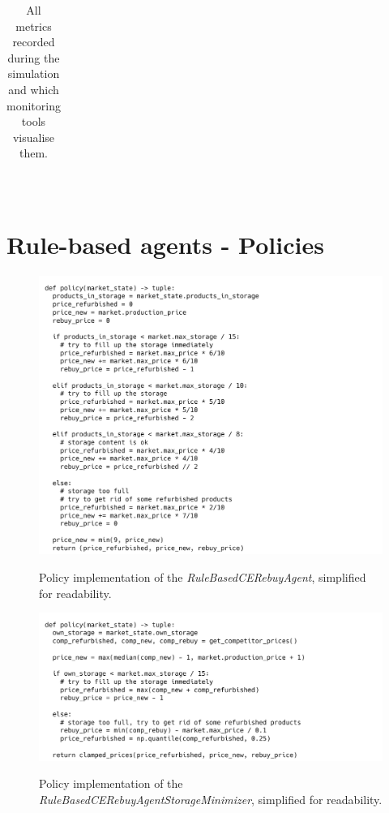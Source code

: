 \begin{table}[!]
\begin{tabular}{|cr|p{2.2mm}|p{2.2mm}|p{2.2mm}|p{2.2mm}|p{2.2mm}|p{2.2mm}|p{2.2mm}|p{2.2mm}|p{2.2mm}|p{2.2mm}|p{2.2mm}|p{2.2mm}|p{2.2mm}|p{2.2mm}|p{2.2mm}|p{2.2mm}|}
	\end{tabular}\\
	\caption{All metrics recorded during the simulation and which monitoring tools visualise them.}\label{tab:AllMetrics}
\end{table}

\newpage
\section{Rule-based agents - Policies}\label{sec:AppendixPolicies}

\begin{figure}[ht]
	\includegraphics[width = \textwidth]{images/policies/RuleBasedCERebuyAgentPolicy.png}\\
	\caption{Policy implementation of the \emph{RuleBasedCERebuyAgent}, simplified for readability.}\label{fig:PolicyRuleBasedCERebuy}
\end{figure}

\begin{figure}[ht]
	\includegraphics[width = \textwidth]{images/policies/RuleBasedCERebuyAgentStorageMinimizerPolicy.png}\\
	\caption{Policy implementation of the \emph{RuleBasedCERebuyAgentStorageMinimizer}, simplified for readability.}\label{fig:PolicyRuleBasedStorageMinimizer}
\end{figure}

